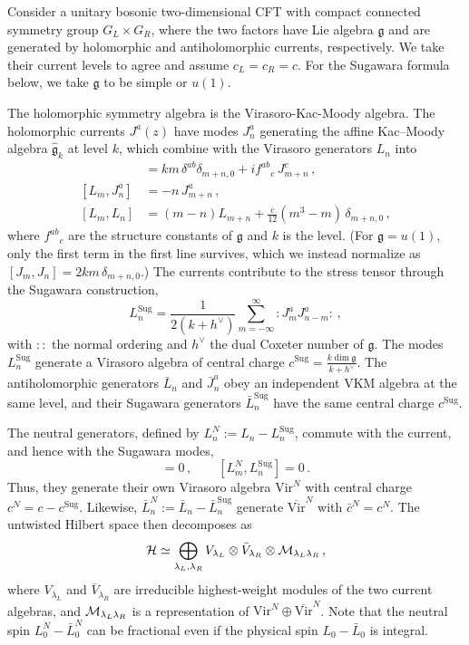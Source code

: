 \documentclass[11pt]{article}
\numberwithin{equation}{section}
\begin{document}
Consider a unitary bosonic two-dimensional CFT with compact connected symmetry group $G_L\times G_R$, where the two factors have Lie algebra $\mathfrak g$ and are generated by holomorphic and antiholomorphic currents, respectively. We take their current levels to agree and assume $c_L=c_R=c$. For the Sugawara formula below, we take $\mathfrak g$ to be simple or $u(1)$. 

The holomorphic symmetry algebra is the Virasoro-Kac-Moody algebra. The holomorphic currents $J^a(z)$ have modes $J^a_n$ generating the affine Kac--Moody algebra $\hat{\mathfrak g}_k$ at level $k$, which combine with the Virasoro generators $L_n$ into
\begin{align}
[J^a_m,J^b_n]&=km\,\delta^{ab}\delta_{m+n,0}+if^{ab}{}_{c}\,J^c_{m+n}\,,\nonumber\\
    [L_m,J^a_n]&=-n\,J^a_{m+n}\,,
    \label{eq:vkm-general}\\
    [L_m,L_n]&=(m-n)L_{m+n}+\frac{c}{12}(m^3-m)\,\delta_{m+n,0}\,,\nonumber
\end{align}
where $f^{ab}{}_{c}$ are the structure constants of $\mathfrak g$ and $k$ is the level. (For $\mathfrak g=u(1)$, only the first term in the first line survives, which we instead normalize
as $[J_m,J_n]=2km\,\delta_{m+n,0}$.) The currents contribute to the stress tensor through the Sugawara construction,
\begin{equation}
    L^{\mathrm{Sug}}_n=\frac{1}{2(k+h^{\vee})}\sum_{m=-\infty}^{\infty}:J^a_mJ^a_{n-m}:\,,
    \label{eq:sugawara-general}
\end{equation}
with $::$ the normal ordering and $h^\vee$ the dual Coxeter number of $\mathfrak g$. The modes $L^{\mathrm{Sug}}_n$ generate a Virasoro algebra of central charge $c^{\mathrm{Sug}}=\frac{k\dim\mathfrak g}{k+h^\vee}$. The antiholomorphic generators $\bar L_n$ and $\bar J^a_n$ obey an independent VKM algebra at the same level, and their Sugawara generators $\bar L_n^{\mathrm{Sug}}$ have the same central charge $c^{\mathrm{Sug}}$.

The neutral generators, defined by $L^N_n:=L_n-L^{\mathrm{Sug}}_n$, commute with the current, and hence with the Sugawara modes,
\begin{equation}
    [L^N_m,J^a_n]=0\,,
    \qquad
    [L^N_m,L^{\mathrm{Sug}}_n]=0\,.
    \label{eq:neutral-commutes}
\end{equation}
Thus, they generate their own Virasoro algebra $\mathrm{Vir}^N$ with central charge $c^N=c-c^{\mathrm{Sug}}$. Likewise, $\bar L^N_n:=\bar L_n-\bar L_n^{\mathrm{Sug}}$ generate $\overline{\mathrm{Vir}}^N$ with $\bar c^N=c^N$. The untwisted Hilbert space then decomposes as
\begin{equation}
\mathcal H\simeq\bigoplus_{\lambda_L,\lambda_R}V_{\lambda_L}\otimes\bar V_{\lambda_R}\otimes\mathcal{M}_{\lambda_L\lambda_R}\,,
    \label{eq:continuous-decomposition}
\end{equation}
where $V_{\lambda_L}$ and $\bar V_{\lambda_R}$ are irreducible highest-weight modules of the two current algebras, and $\mathcal{M}_{\lambda_L\lambda_R}$ is a representation of $\mathrm{Vir}^N\oplus\overline{\mathrm{Vir}}^N$. Note that  the neutral spin $L_0^N-\bar L_0^N$ can be fractional even if  the physical spin $L_0-\bar L_0$ is integral.
\end{document}
